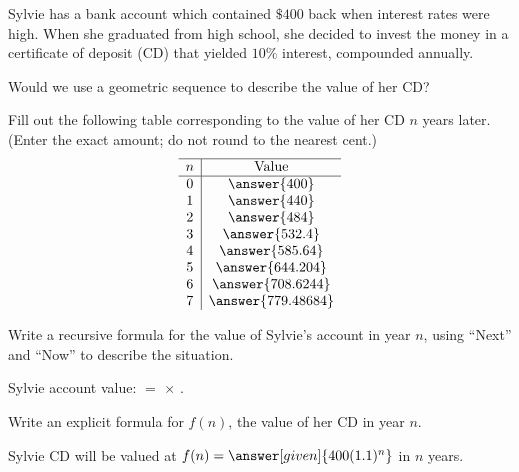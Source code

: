 \documentclass[nooutcomes]{ximera}
\begin{document}
\begin{problem}
Sylvie has a bank account which contained $\$400$ back when interest rates were high.  When she graduated from high school, she decided to invest the money in a certificate of deposit (CD) that yielded $10\%$ interest, compounded annually.  

Would we use a geometric sequence to describe the value of her CD?
\begin{multipleChoice}
\end{multipleChoice}

\begin{problem}
Fill out the following table corresponding to the value of her CD $n$ years later. (Enter the exact amount; do not round to the nearest cent.)
\[
\begin{array}{c|c} \hline
n & \text{Value} \\ \hline
0 & \answer{400}\\
1 & \answer{440} \\
2 & \answer{484} \\
3 & \answer{532.4}\\
4 & \answer{585.64}\\
5 & \answer{644.204}\\
6 & \answer{708.6244}\\
7 & \answer{779.48684}\\
\end{array}
\]

\begin{problem}
Write a recursive formula for the value of Sylvie's account in year $n$, using ``Next'' and ``Now'' to describe the situation.

\begin{prompt}
Sylvie account value:  $=$   $\times$  .
\end{prompt}


\begin{problem}

Write an explicit formula for $f(n)$, the value of her CD in year $n$.

\begin{prompt}
Sylvie CD will be valued at $f(n) = \answer[given]{400(1.1)^n}$ in $n$ years.
\end{prompt}

\end{problem}

\end{problem}

\end{problem}

\end{problem}
\end{document}
